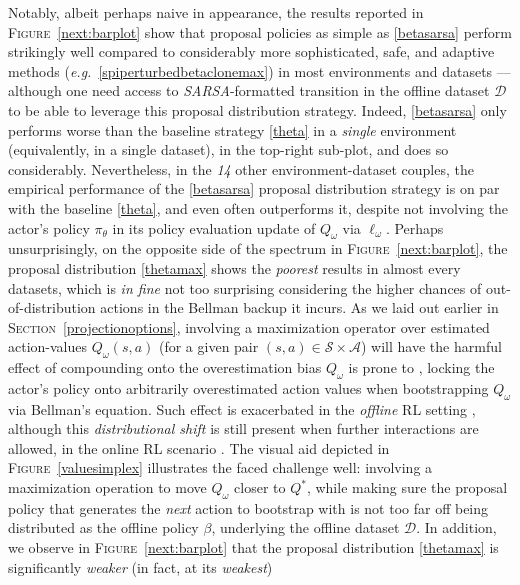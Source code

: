 Notably, albeit perhaps naive in appearance, the results reported in
\textsc{Figure}~\ref{next:barplot}
show that proposal policies as simple as \ref{betasarsa} perform strikingly well
compared to considerably more sophisticated, safe, and adaptive methods
(\textit{e.g.}~\ref{spiperturbedbetaclonemax})
in most environments and datasets
--- although one need access to \textit{SARSA}-formatted transition in the offline dataset $\mathcal{D}$
to be able to leverage this proposal distribution strategy.
Indeed, \ref{betasarsa} only performs worse than the baseline strategy \ref{theta} in a \emph{single}
environment (equivalently, in a single dataset), in the top-right sub-plot,
and does so considerably.
Nevertheless, in the \emph{14} other environment-dataset couples, the empirical performance of the
\ref{betasarsa} proposal distribution strategy is on par with the baseline \ref{theta}, and even often outperforms
it, despite not involving the actor's policy $\pi_\theta$
in its policy evaluation update of $Q_\omega$ via $\ell_\omega$.
Perhaps unsurprisingly, on the opposite side of the spectrum in \textsc{Figure}~\ref{next:barplot},
the proposal distribution \ref{thetamax} shows the \emph{poorest} results in almost every datasets,
which is \textit{in fine} not too surprising considering the higher chances of
out-of-distribution actions in the Bellman backup it incurs.
As we laid out earlier in \textsc{Section}~\ref{projectionoptions},
involving a maximization operator over estimated action-values $Q_\omega(s,a)$ (for a given pair
$(s,a) \in \mathcal{S} \times \mathcal{A}$)
will have the harmful effect of compounding onto the overestimation bias $Q_\omega$ is prone to
\cite{Thrun1993-or},
locking the actor's policy onto arbitrarily overestimated action values when bootstrapping $Q_\omega$
via Bellman's equation.
Such effect is exacerbated in the \emph{offline} RL setting \cite{Levine2020-hz},
although this \textit{distributional shift} is still present when further interactions are allowed,
in the online RL scenario \cite{Fu2019-kb}.
The visual aid depicted in \textsc{Figure}~\ref{valuesimplex} illustrates the faced challenge well:
involving a maximization operation to move $Q_\omega$ closer to $Q^*$, while making sure the proposal policy
that generates the \textit{next} action to bootstrap with is not too far off being distributed as the offline policy
$\beta$, underlying the offline dataset $\mathcal{D}$.
In addition, we observe in \textsc{Figure}~\ref{next:barplot} that the proposal distribution \ref{thetamax} is
significantly \emph{weaker} (in fact, at its \emph{weakest})
